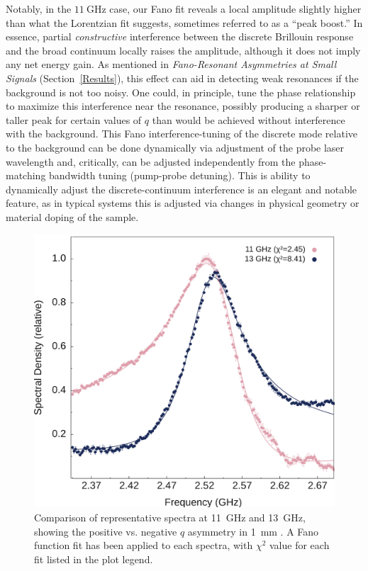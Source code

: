Notably, in the \(\SI{11}{\giga\hertz}\) case, our Fano fit reveals a local amplitude slightly higher than what the Lorentzian fit suggests, sometimes referred to as a “peak boost.” In essence, partial \emph{constructive} interference between the discrete Brillouin response and the broad continuum locally raises the amplitude, although it does not imply any net energy gain. As mentioned in \textit{Fano-Resonant Asymmetries at Small Signals} (Section~\ref{Results}), this effect can aid in detecting weak resonances if the background is not too noisy. One could, in principle, tune the phase relationship to maximize this interference near the resonance, possibly producing a sharper or taller peak for certain values of \(q\) than would be achieved without interference with the background. This Fano interference-tuning of the discrete mode relative to the background can be done dynamically via adjustment of the probe laser wavelength and, critically, can be adjusted independently from the phase-matching bandwidth tuning (pump-probe detuning). This is ability to dynamically adjust the discrete-continuum interference is an elegant and notable feature, as in typical systems this is adjusted via changes in physical geometry or material doping of the sample.\cite{ko2023full, gu2020fano, rieger2023fano}

\begin{figure}[ht]
  \centering
  \includegraphics[width=\textwidth]{figs/3-CoBS/CS2FanoCompare.png}
  \caption[Comparison of representative spectra at \SI{11}{\giga\hertz} and \SI{13}{\giga\hertz}, showing the positive vs. negative \(q\) asymmetry in \SI{1}{\milli\meter} , with a Fano fit applied.]{Comparison of representative spectra at \SI{11}{\giga\hertz} and \SI{13}{\giga\hertz}, showing the positive vs. negative \(q\) asymmetry in \SI{1}{\milli\meter} . A Fano function fit has been applied to each spectra, with \(\chi^{2}\) value for each fit listed in the plot legend.}
  \label{fig:CS2FanoCompare}
\end{figure}

